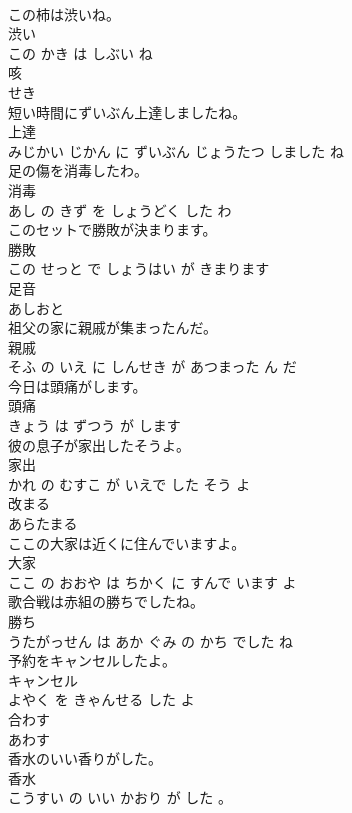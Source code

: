 \documentclass[8pt]{extreport}
\begin{document}
\begin{CJK}{UTF8}{min}
\\	この柿は渋いね。	
\\	渋い 
\\	この かき は しぶい ね			
\\	咳	
\\	せき			
\\	短い時間にずいぶん上達しましたね。	
\\	上達 
\\	みじかい じかん に ずいぶん じょうたつ しました ね			
\\	足の傷を消毒したわ。	
\\	消毒 
\\	あし の きず を しょうどく した わ			
\\	このセットで勝敗が決まります。	
\\	勝敗 
\\	この せっと で しょうはい が きまります			
\\	足音	
\\	あしおと			
\\	祖父の家に親戚が集まったんだ。	
\\	親戚 
\\	そふ の いえ に しんせき が あつまった ん だ			
\\	今日は頭痛がします。	
\\	頭痛 
\\	きょう は ずつう が します			
\\	彼の息子が家出したそうよ。	
\\	家出 
\\	かれ の むすこ が いえで した そう よ			
\\	改まる	
\\	あらたまる			
\\	ここの大家は近くに住んでいますよ。	
\\	大家 
\\	ここ の おおや は ちかく に すんで います よ			
\\	歌合戦は赤組の勝ちでしたね。	
\\	勝ち 
\\	うたがっせん は あか ぐみ の かち でした ね			
\\	予約をキャンセルしたよ。	
\\	キャンセル 
\\	よやく を きゃんせる した よ			
\\	合わす	
\\	あわす			
\\	香水のいい香りがした。	
\\	香水 
\\	こうすい の いい かおり が した 。			

\end{CJK}
\end{document}
